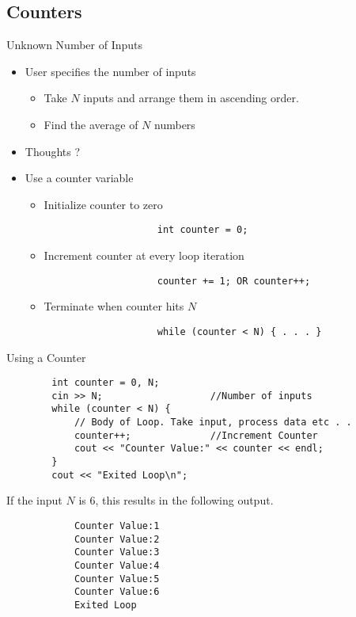 \subsection{Counters}

\begin{frame}[fragile]{Unknown Number of Inputs}{}
    \begin{itemize}
        \item User specifies the number of inputs
        \begin{itemize}
            \item Take $N$ inputs and arrange them in ascending order.
            \item Find the average of $N$ numbers
        \end{itemize}
        \pause
        \item Thoughts ?
        \pause
        \item Use a counter variable
        \begin{itemize}
            \item Initialize counter to zero
                \begin{verbatim}
                    int counter = 0;
                \end{verbatim}
        \pause
            \item Increment counter at every loop iteration
                \begin{verbatim}
                    counter += 1; OR counter++;
                \end{verbatim}
        \pause
            \item Terminate when counter hits $N$
                \begin{verbatim}
                    while (counter < N) { . . . }
                \end{verbatim}
        \end{itemize}
    \end{itemize}
\end{frame}

\begin{frame}[fragile]{Using a Counter}{}
    \begin{verbatim}
        int counter = 0, N;
        cin >> N;                   //Number of inputs
        while (counter < N) {
            // Body of Loop. Take input, process data etc . .
            counter++;              //Increment Counter
            cout << "Counter Value:" << counter << endl;
        }
        cout << "Exited Loop\n";
    \end{verbatim}
    \pause
    \begin{block}{If the input $N$ is 6, this results in the following output.}
        \begin{verbatim}
            Counter Value:1
            Counter Value:2
            Counter Value:3
            Counter Value:4
            Counter Value:5
            Counter Value:6
            Exited Loop
        \end{verbatim}
    \end{block}
\end{frame}
